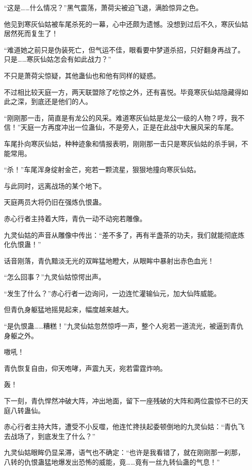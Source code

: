 
\begin{this_body}

“这是……什么情况？”黑气震荡，萧荷尖被迫飞退，满脸惊异之色。

他见到寒灰仙姑被车尾杀死的一幕，心中还颇为遗憾。没想到过后不久，寒灰仙姑居然死而复生了！

“难道她之前只是伪装死亡，但气运不佳，眼看要中梦道杀招，只好翻身再战了。只是……寒灰仙姑怎会有如此战力？”

不只是萧荷尖惊疑，其他蛊仙也和他有同样的疑惑。

不过相比较天庭一方，两天联盟除了吃惊之外，还有喜悦。毕竟寒灰仙姑隐藏得如此之深，到底还是他们的人。

“刚刚那一击，简直是有龙公的风采。难道寒灰仙姑是龙公一级的人物？哼，我不信！”天庭一方再度冲出一位蛊仙，不是旁人，正是在此战中大展风采的车尾。

车尾扑向寒灰仙姑，种种迹象和情报表明，刚刚那一击只是寒灰仙姑的杀手锏，不能常用。

“杀！”车尾浑身绽射金芒，宛若一颗流星，狠狠地撞向寒灰仙姑。

与此同时，远离战场的某个地下。

天庭两员大将仍旧在强炼仇恨蛊。

赤心行者主持着大阵，青仇一动不动宛若雕像。

九灵仙姑的声音从雕像中传出：“差不多了，再有半盏茶的功夫，我们就能彻底炼化仇恨蛊！”

话音刚落，青仇黯淡无光的双眸猛地瞪大，从眼眸中暴射出赤色血光！

“怎么回事？”九灵仙姑惊愕出声。

“发生了什么？”赤心行者一边询问，一边连忙灌输仙元，加大仙阵威能。

但青仇身躯猛地摇晃起来，幅度越来越大。

“是仇恨蛊……糟糕！”九灵仙姑忽然惊呼一声，整个人宛若一道流光，被逼到青仇身躯之外。

嗷吼！

青仇恢复自由，仰天咆哮，声震九天，宛若雷霆炸响。

轰！

下一刻，青仇悍然冲破大阵，冲出地面，留下一座残破的大阵和两位震惊不已的天庭八转蛊仙。

赤心行者主持大阵，遭受不小反噬，他连忙搀扶起委顿倒地的九灵仙姑：“青仇飞去战场了，到底发生了什么？”

九灵仙姑眼眸仍显呆滞，语气也不确定：“也许是我看错了，就在刚刚那一刹那，八转的仇恨蛊猛地爆发出恐怖的威能，竟……竟有一丝九转仙蛊的气息！”


\end{this_body}
